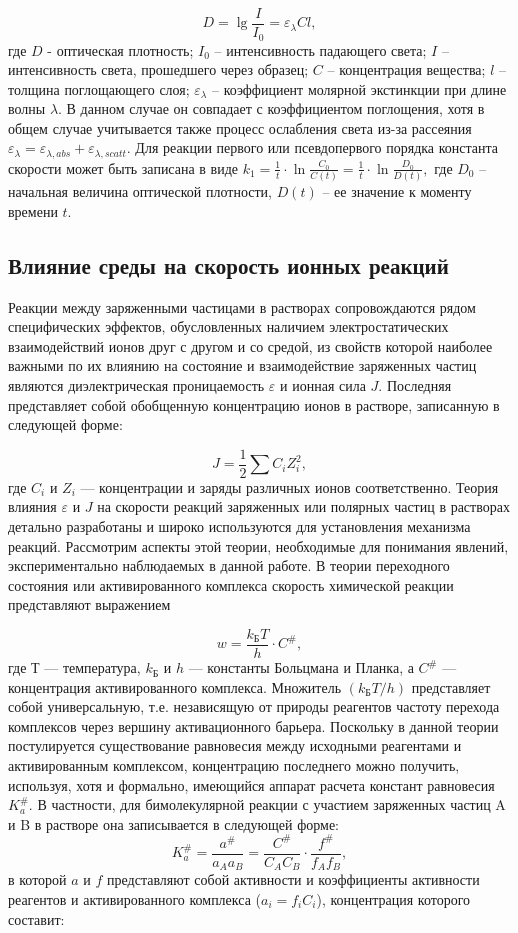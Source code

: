 \documentclass[a4paper, 12pt]{article}
\begin{document}
\[D=\lg{\frac{I}{I_0}}=\varepsilon_\lambda Cl,\]
где $D$ - оптическая плотность; $I_0$ – интенсивность падающего света; $I$ – интенсивность
света, прошедшего через образец; $C$ – концентрация вещества; $l$ – толщина
поглощающего слоя; $\varepsilon_\lambda$ – коэффициент молярной экстинкции при длине волны $\lambda$. В
данном случае он совпадает с коэффициентом поглощения, хотя в общем случае
учитывается также процесс ослабления света из-за рассеяния $\varepsilon_\lambda = \varepsilon_{\lambda,abs} + \varepsilon_{\lambda,scatt}.$
Для реакции первого или псевдопервого порядка константа скорости может быть
записана в виде $k_1=\frac{1}{t}\cdot\ln{\frac{C_0}{C(t)}}=\frac{1}{t}\cdot\ln{\frac{D_0}{D(t)}},$
где $D_0$ – начальная величина оптической
плотности, $D(t)$ – ее значение к моменту времени $t$.

	\subsection*{Влияние среды на скорость ионных реакций}
	Реакции между заряженными частицами в растворах сопровождаются рядом
специфических эффектов, обусловленных наличием электростатических взаимодействий ионов друг с другом и со средой, из свойств которой наиболее важными по
их влиянию на состояние и взаимодействие заряженных частиц являются диэлектрическая проницаемость $\varepsilon$ и ионная сила $J$. Последняя представляет собой обобщенную
концентрацию ионов в растворе, записанную в следующей форме:

\[J= \frac{1}{2} \sum{C_i Z_i^2},\]
где $C_i$ и $Z_i$ — концентрации и заряды различных ионов соответственно.
Теория влияния $\varepsilon$ и $J$ на скорости реакций заряженных или полярных частиц в
растворах детально разработаны и широко используются для установления механизма
реакций. Рассмотрим аспекты этой теории, необходимые для понимания явлений,
экспериментально наблюдаемых в данной работе.
В теории переходного состояния или активированного комплекса скорость
химической реакции представляют выражением

 \[w = \frac{k_\text{Б}T}{h}\cdot C^\#,\]
где $Т$ — температура, $k_\text{Б}$ и $h$ — константы Больцмана и Планка, а $C^\#$ — концентрация активированного комплекса. Множитель $(k_\text{Б}T / h)$ представляет собой универсальную, т.е. независящую от природы реагентов частоту перехода комплексов через вершину
активационного барьера.
Поскольку в данной теории постулируется существование равновесия между
исходными реагентами и активированным комплексом, концентрацию последнего
можно получить, используя, хотя и формально, имеющийся аппарат расчета констант
равновесия $K_a^\#$. В частности, для бимолекулярной реакции с участием заряженных частиц A и B в растворе она записывается в следующей форме:
\[K_a^\#=\frac{a^\#}{a_Aa_B}=\frac{C^\#}{C_AC_B}\cdot\frac{f^\#}{f_Af_B},\]
в которой $a$ и $f$ представляют собой активности и коэффициенты активности реагентов
и активированного комплекса ($a_i = f_i C_i$), концентрация которого составит:
\end{document}
